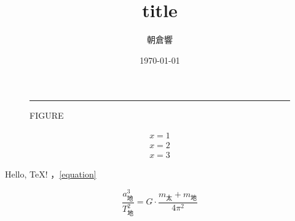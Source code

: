 \documentclass[fleqn]{ltjsarticle}
\title{title}
\author{朝倉響}
\date{\today}
\begin{document}
  \maketitle
  \blindmathpaper
  \blinddocument
  \renewcommand{\figurename}{図}
  \begin{figure}[bthp]
    \centering
    \rule{0.45\hsize}{0.1\vsize}
    \caption{FIGURE}
    \label{figure}
  \end{figure}

  \begin{align}
    x=1\label{equation}\\x=2\\x=3
  \end{align}

  Hello, \TeX! ，\eqref{equation}

  \[ %
  \frac{a_{地}^3}{T_{地}^2} = G\cdot\frac{m_{太} + m_{地}}{4\pi^2}
\]
\end{document}
